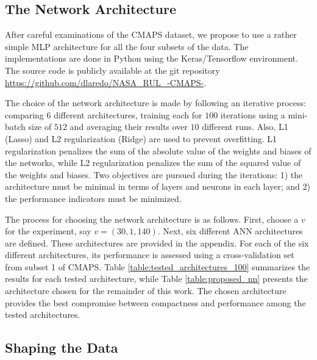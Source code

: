 \documentclass[12pt]{IEEEtran}%
\begin{document}
\subsection{The Network Architecture}

After careful examinations of the CMAPS dataset, we propose to use a rather
simple MLP architecture for all the four subsets of the data. The
implementations are done in Python using the Keras/Tensorflow environment. The
source code is publicly available at the git repository \url{https://github.com/dlaredo/NASA_RUL_-CMAPS-}.

The choice of the network architecture is made by following an iterative
process: comparing 6 different architectures, training each for $100$
iterations using a mini-batch size of $512$ and averaging their results over
$10$ different runs. Also, L1 (Lasso) and L2 regularization (Ridge) 
\cite{Buhlmann2011} are used to prevent overfitting. L1 regularization 
penalizes the sum of the absolute value of the weights and biases of the networks, 
while L2 regularization penalizes the sum of the squared value of the weights and biases. 
Two objectives are pursued during the iterations: 1) the architecture must be minimal in 
terms of layers and neurons in each layer; and 2) the performance indicators must be minimized.

The process for choosing the network architecture is as follows. First, choose
a $v$ for the experiment, say $v= (30, 1, 140)$. Next, six different ANN
architectures are defined. These architectures are provided in
the appendix. For each of the six different architectures,
its performance is assessed using a cross-validation set from subset 1 of
CMAPS. Table \ref{table:tested_architectures_100} summarizes the results for
each tested architecture, while Table \ref{table:proposed_nn} presents the
architecture chosen for the remainder of this work. The chosen architecture
provides the best compromise between compactness and performance among the
tested architectures.

\subsection{Shaping the Data}
\end{document}
